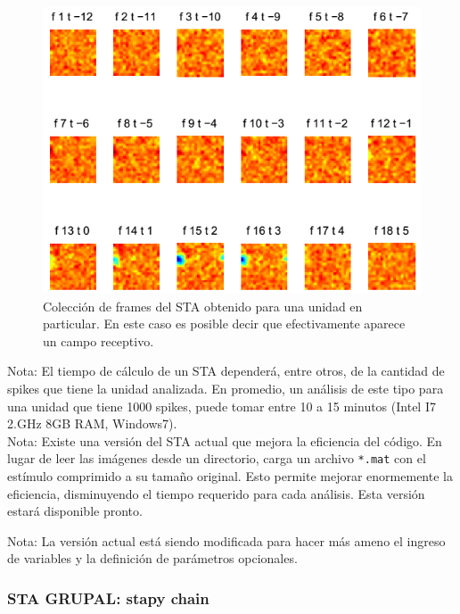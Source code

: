 \documentclass[10pt]{article}
\begin{document}
\begin{center}
\begin{figure}[h!]
\centering
\includegraphics[scale=0.5, natwidth=640, natheight=480]{staframesraw_2.png} 	%
\caption{ Colección de frames del STA obtenido para una unidad en particular. En este caso es posible decir que efectivamente aparece un campo receptivo. }
\label{fig:staframes}
\end{figure}
\end{center}

Nota: El tiempo de cálculo de un STA dependerá, entre otros, de la cantidad de spikes que tiene la unidad analizada. En promedio, un análisis de este tipo para una unidad que tiene 1000 spikes, puede tomar entre 10 a 15 minutos (Intel I7 2.GHz 8GB RAM, Windows7). \\

Nota: Existe una versión del STA actual que mejora la eficiencia del código. En lugar de leer las imágenes desde un directorio, carga un archivo \verb+*.mat+ con el estímulo comprimido a su tamaño original. Esto permite mejorar enormemente la eficiencia, disminuyendo el tiempo requerido para cada análisis. Esta versión estará disponible pronto.

Nota: La versión actual está siendo modificada para hacer más ameno el ingreso de variables y la definición de parámetros opcionales. 

\subsubsection{ STA GRUPAL: stapy chain } 
	
\end{document}
